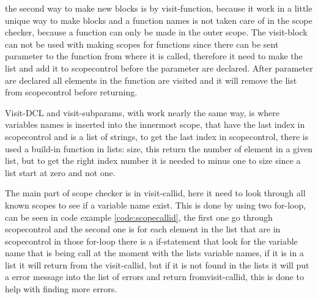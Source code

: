 the second way to make new blocks is by visit-function, because it work in a little unique way to make blocks and a function names is not taken care of in the scope checker, because a function can only be made in the outer scope. The visit-block can not be used with making scopes for functions since there can be sent parameter to the function from where it is called, therefore it need to make the list and add it to scopecontrol before the parameter are declared. After parameter are declared all elements in the function are visited and it will remove the list from scopecontrol before returning.

Visit-DCL and visit-subparams, with work nearly the same way, is where variables names is inserted into the innermost scope, that have the last index in scopecontrol and is a list of strings, to get the last index in scopecontrol, there is used a build-in function in lists: size, this return the number of element in a given list, but to get the right index number it is needed to minus one to size since a list start at zero and not one.

The main part of scope checker is in visit-callid, here it need to look through all known scopes to see if a variable name exist. This is done by using two for-loop, can be seen in code example \ref{code:scopecallid}, the first one go through scopecontrol and the second one is for each element in the list that are in scopecontrol in those for-loop there is a if-statement that look for the variable name that is being call at the moment with the lists variable names, if it is in a list it will return from the visit-callid, but if it is not found in the lists it will put a error message into the list of errors and return fromvisit-callid, this is done to help with finding more errors.

 
